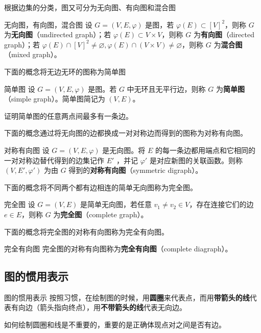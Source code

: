 根据边集的分类，图又可分为无向图、有向图和混合图
\begin{definition}{无向图，有向图，混合图}
设 $G=(V,E,\varphi)$ 是图，若 $\varphi(E)\subset[V]^2$，则称 $G$ 为\textbf{无向图}（undirected graph）；若 $\varphi(E)\subset V\times V$，则称 $G$ 为\textbf{有向图}（directed graph）；若 $\varphi(E)\cap[V]^2\neq\varnothing,\varphi(E)\cap (V\times V)\neq\varnothing$，则称 $G$ 为\textbf{混合图}（mixed graph）。
\end{definition}

下面的概念将无边无环的图称为简单图
\begin{definition}{简单图}
设 $G=(V,E,\varphi)$ 是图。若 $G$ 中无环且无平行边，则称 $G$ 为\textbf{简单图}（simple graph）。简单图简记为 $(V,E)$。
\end{definition}
\begin{exercise}{}
证明简单图的任意两点间最多有一条边。
\end{exercise}

下面的概念通过将无向图的边都换成一对对称边而得到的图称为对称有向图。

\begin{definition}{对称有向图}
设 $G=(V,E,\varphi)$ 是无向图。将 $E$ 的每一条边都用端点和它相同的一对对称边替代得到的边集记作 $E'$ ，并记 $\varphi'$ 是对应新图的关联函数。则称 $(V,E',\varphi')$ 为由 $G$ 得到的\textbf{对称有向图}（symmetric digraph）。 
\end{definition}

下面的概念将不同两个都有边相连的简单无向图称为完全图。
\begin{definition}{完全图}
设 $G=(V,E)$ 是简单无向图，若任意 $v_1\neq v_2\in V$，存在连接它们的边 $e\in E$，则称 $G$ 为\textbf{完全图}（complete graph）。
\end{definition}

下面的概念将完全图的对称有向图称为完全有向图。
\begin{definition}{完全有向图}
完全图的对称有向图称为\textbf{完全有向图}（complete diagraph）。
\end{definition}



\subsection{图的惯用表示}

\begin{definition}{图的惯用表示}
按照习惯，在绘制图的时候，用\textbf{圆圈}来代表点，而用\textbf{带箭头的线}代表有向边（箭头指向终点），用\textbf{不带箭头的线}代表无向边。
\end{definition}
如何绘制圆圈和线是不重要的，重要的是正确体现点对之间是否有边。
